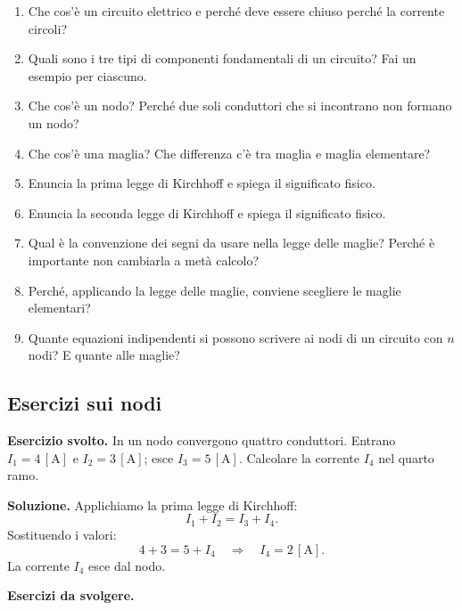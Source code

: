 \begin{enumerate}[leftmargin=1cm]
  \item Che cos'è un circuito elettrico e perché deve essere chiuso perché la corrente circoli?
  \item Quali sono i tre tipi di componenti fondamentali di un circuito? Fai un esempio per ciascuno.
  \item Che cos'è un nodo? Perché due soli conduttori che si incontrano non formano un nodo?
  \item Che cos'è una maglia? Che differenza c'è tra maglia e maglia elementare?
  \item Enuncia la prima legge di Kirchhoff e spiega il significato fisico.
  \item Enuncia la seconda legge di Kirchhoff e spiega il significato fisico.
  \item Qual è la convenzione dei segni da usare nella legge delle maglie? Perché è importante non cambiarla a metà calcolo?
  \item Perché, applicando la legge delle maglie, conviene scegliere le maglie elementari?
  \item Quante equazioni indipendenti si possono scrivere ai nodi di un circuito con \(n\) nodi? E quante alle maglie?
\end{enumerate}

\subsection{Esercizi sui nodi}

\begin{esercizio}
\textbf{Esercizio svolto.} In un nodo convergono quattro conduttori. Entrano \(I_1 = 4\,[\text{A}]\) e \(I_2 = 3\,[\text{A}]\); esce \(I_3 = 5\,[\text{A}]\). Calcolare la corrente \(I_4\) nel quarto ramo.

\smallskip
\textbf{Soluzione.} Applichiamo la prima legge di Kirchhoff:
\[
I_1 + I_2 = I_3 + I_4.
\]
Sostituendo i valori:
\[
4 + 3 = 5 + I_4 \quad \Longrightarrow \quad I_4 = 2\,[\text{A}].
\]
La corrente \(I_4\) esce dal nodo.
\end{esercizio}

\textbf{Esercizi da svolgere.}

